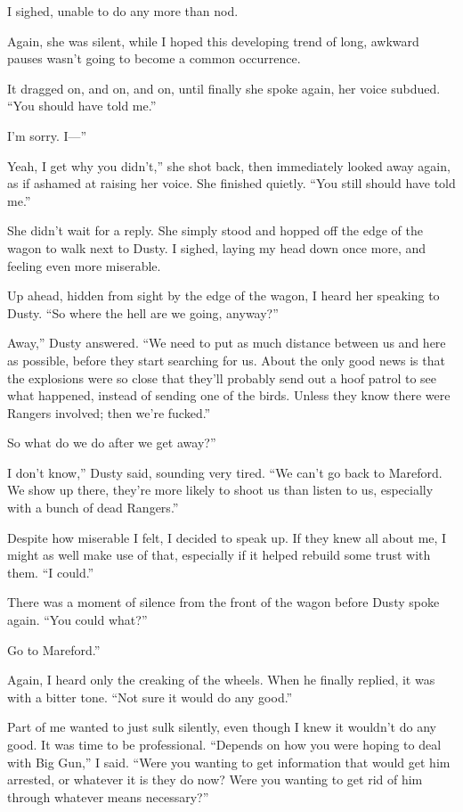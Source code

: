 I sighed, unable to do any more than nod.

Again, she was silent, while I hoped this developing trend of long, awkward pauses wasn’t going to become a common occurrence.

It dragged on, and on, and on, until finally she spoke again, her voice subdued. “You should have told me.”

\leavevmode{}I’m sorry. I—”

\leavevmode{}Yeah, I get why you didn’t,” she shot back, then immediately looked away again, as if ashamed at raising her voice. She finished quietly. “You still should have told me.”

She didn’t wait for a reply. She simply stood and hopped off the edge of the wagon to walk next to Dusty. I sighed, laying my head down once more, and feeling even more miserable.

Up ahead, hidden from sight by the edge of the wagon, I heard her speaking to Dusty. “So where the hell are we going, anyway?”

\leavevmode{}Away,” Dusty answered. “We need to put as much distance between us and here as possible, before they start searching for us. About the only good news is that the explosions were so close that they’ll probably send out a hoof patrol to see what happened, instead of sending one of the birds. Unless they know there were Rangers involved; then we’re fucked.”

\leavevmode{}So what do we do after we get away?”

\leavevmode{}I don’t know,” Dusty said, sounding very tired. “We can’t go back to Mareford. We show up there, they’re more likely to shoot us than listen to us, especially with a bunch of dead Rangers.”

Despite how miserable I felt, I decided to speak up. If they knew all about me, I might as well make use of that, especially if it helped rebuild some trust with them. “I could.”

There was a moment of silence from the front of the wagon before Dusty spoke again. “You could what?”

\leavevmode{}Go to Mareford.”

Again, I heard only the creaking of the wheels. When he finally replied, it was with a bitter tone. “Not sure it would do any good.”

Part of me wanted to just sulk silently, even though I knew it wouldn’t do any good. It was time to be professional. “Depends on how you were hoping to deal with Big Gun,” I said. “Were you wanting to get information that would get him arrested, or whatever it is they do now? Were you wanting to get rid of him through whatever means necessary?”

